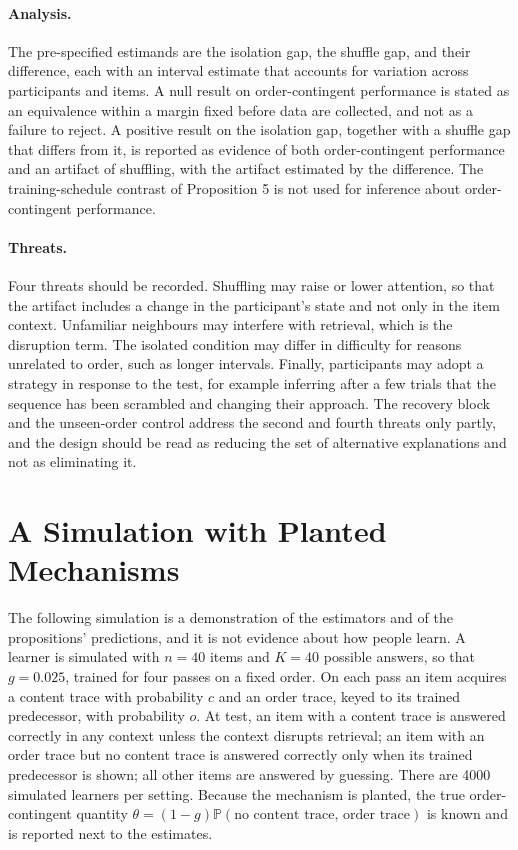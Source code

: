 \documentclass[11pt]{article}
\theoremstyle{remark}
\renewcommand{\Pr}{\mathbb{P}}
\begin{document}
\paragraph{Analysis.} The pre-specified estimands are the isolation gap, the shuffle gap, and their difference, each with an interval estimate that accounts for variation across participants and items. A null result on order-contingent performance is stated as an equivalence within a margin fixed before data are collected, and not as a failure to reject. A positive result on the isolation gap, together with a shuffle gap that differs from it, is reported as evidence of both order-contingent performance and an artifact of shuffling, with the artifact estimated by the difference. The training-schedule contrast of Proposition 5 is not used for inference about order-contingent performance.

\paragraph{Threats.} Four threats should be recorded. Shuffling may raise or lower attention, so that the artifact includes a change in the participant's state and not only in the item context. Unfamiliar neighbours may interfere with retrieval, which is the disruption term. The isolated condition may differ in difficulty for reasons unrelated to order, such as longer intervals. Finally, participants may adopt a strategy in response to the test, for example inferring after a few trials that the sequence has been scrambled and changing their approach. The recovery block and the unseen-order control address the second and fourth threats only partly, and the design should be read as reducing the set of alternative explanations and not as eliminating it.

\section{A Simulation with Planted Mechanisms}

The following simulation is a demonstration of the estimators and of the propositions' predictions, and it is not evidence about how people learn. A learner is simulated with $n=40$ items and $K=40$ possible answers, so that $g=0.025$, trained for four passes on a fixed order. On each pass an item acquires a content trace with probability $c$ and an order trace, keyed to its trained predecessor, with probability $o$. At test, an item with a content trace is answered correctly in any context unless the context disrupts retrieval; an item with an order trace but no content trace is answered correctly only when its trained predecessor is shown; all other items are answered by guessing. There are 4000 simulated learners per setting. Because the mechanism is planted, the true order-contingent quantity $\theta=(1-g)\Pr(\text{no content trace, order trace})$ is known and is reported next to the estimates.
\end{document}

